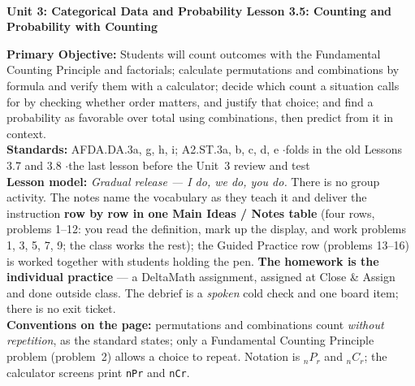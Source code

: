 \documentclass[10pt]{article}
\newcommand{\UnitNumberName}{Unit 3: Categorical Data and Probability \quad}
\newcommand{\LessonNumberName}{Lesson 3.5: Counting and Probability with Counting}
\newcommand{\Pnr}[2]{{}_{#1}P_{#2}}
\newcommand{\Cnr}[2]{{}_{#1}C_{#2}}
\begin{document}
\begin{center}
    {\Large\bfseries \CourseName \\
    {\small\bfseries \UnitNumberName \LessonNumberName}}
\end{center}

\begin{tcolorbox}[colback=frost, colframe=cerulean, boxrule=0.9pt, arc=2mm,
    left=2mm, right=2mm, top=1.5mm, bottom=1.5mm]
    \textbf{Primary Objective:} Students will count outcomes with the Fundamental Counting
    Principle and factorials; calculate permutations and combinations by formula and verify them
    with a calculator; decide which count a situation calls for by checking whether order
    matters, and justify that choice; and find a probability as favorable over total using
    combinations, then predict from it in context.
    \\[2pt]
    \textbf{Standards:} AFDA.DA.3a, g, h, i; A2.ST.3a, b, c, d, e \quad$\cdot$\quad folds in the
    old Lessons 3.7 and 3.8 \quad$\cdot$\quad the last lesson before the Unit~3 review and test
    \\[2pt]
    \textbf{Lesson model:} \emph{Gradual release --- I do, we do, you do.} There is no group
    activity. The notes name the vocabulary as they teach it and deliver the instruction
    \textbf{row by row in one Main Ideas / Notes table} (four rows, problems 1--12: you read
    the definition, mark up the display, and work problems 1, 3, 5, 7, 9; the class works the
    rest); the Guided Practice row (problems 13--16) is worked together with students holding
    the pen. \textbf{The homework is the individual practice} --- a DeltaMath assignment,
    assigned at Close \& Assign and done outside class. The debrief is a \emph{spoken} cold check and one board item; there
    is no exit ticket.
    \\[2pt]
    \textbf{Conventions on the page:} permutations and combinations count \emph{without
    repetition}, as the standard states; only a Fundamental Counting Principle problem
    (problem~2) allows a choice to repeat. Notation is $\Pnr{n}{r}$ and $\Cnr{n}{r}$; the
    calculator screens print \texttt{nPr} and \texttt{nCr}.
\end{tcolorbox}
\end{document}
